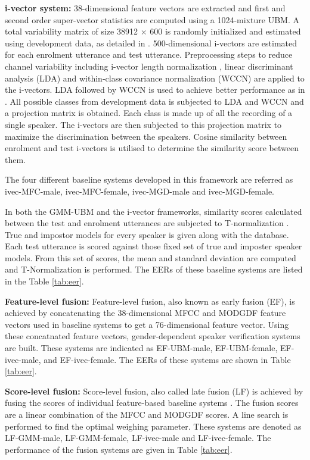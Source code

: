\documentclass{article}
\begin{document}
\textbf{i-vector system:} 
38-dimensional feature vectors are extracted and first and
 second order super-vector statistics are computed using a
 1024-mixture UBM. A total variability matrix of size 38912
 $\times$ 600 is randomly initialized and estimated using
 development data, as detailed in \cite{dehak_ivector, kenny_JFA}. 
500-dimensional i-vectors are estimated for each enrolment
utterance and test utterance. Preprocessing steps to reduce
channel variability including i-vector length normalization
\cite{garciaRomero}, linear discriminant analysis (LDA) and
within-class covariance normalization (WCCN) are applied to the
i-vectors.%
LDA followed by WCCN is used to achieve better performance as in \cite{dehak_ivector}. 
All possible classes from development data is subjected to LDA and WCCN and a projection
matrix is obtained. Each class is made up of all the recording of a single speaker. The 
i-vectors are then subjected to this projection matrix to maximize the discrimination
between the speakers. Cosine similarity between enrolment and test i-vectors is 
utilised to determine the similarity score between them.

The four different baseline systems developed in this framework
are referred as ivec-MFC-male, ivec-MFC-female, ivec-MGD-male
and ivec-MGD-female.

In both the GMM-UBM and the i-vector frameworks, similarity
scores calculated between the test and enrolment utterances 
are subjected to T-normalization \cite{tnorm}. True and impostor
models for every speaker is given along with the database. Each 
test utterance is scored against those fixed set of true and imposter 
speaker models. From this set of scores, the mean and standard
deviation are computed and T-Normalization is performed. The 
EERs of these baseline systems are listed in the Table \ref{tab:eer}.


\textbf{Feature-level fusion:} 
Feature-level fusion, also known as early fusion (EF),
is achieved by concatenating the 38-dimensional MFCC and MODGDF feature vectors 
used in baseline systems to get a 76-dimensional feature vector. Using these
concatnated feature vectors, gender-dependent speaker verification systems
 are built. These systems are indicated as EF-UBM-male, EF-UBM-female, 
 EF-ivec-male, and EF-ivec-female. The EERs of these systems are shown in 
 Table  \ref{tab:eer}.

\textbf{Score-level fusion:}  Score-level fusion, also called late fusion (LF)
is achieved by
fusing the scores of individual feature-based baseline systems
\cite{fusion}. The fusion scores are a linear combination of
the MFCC and MODGDF scores. A line search is performed to find
the optimal weighing parameter. These systems are denoted as
LF-GMM-male, LF-GMM-female, LF-ivec-male and LF-ivec-female.
The performance of the fusion systems are given in Table
\ref{tab:eer}. 
\end{document}
